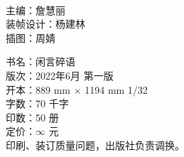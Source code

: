 \documentclass[twoside,openany]{ctexbook}
\begin{document}

\thispagestyle{empty}

\thispagestyle{empty}
\newpage
\ %
\thispagestyle{empty}
\newpage



\thispagestyle{empty}


\clearpage

\thispagestyle{empty}
\vspace*{\fill}

\begin{flushleft}
  \begingroup

  主\hspace*{2\ccwd}编：詹慧丽\\
  装帧设计：杨建林\\
  插\hspace*{2\ccwd}图：周\hspace*{1\ccwd}婧\\
  \endgroup
\end{flushleft}
\vspace{3em}
\begin{flushleft}

  \begingroup

  书\hspace*{2\ccwd}名：闲言碎语\\
  版\hspace*{2\ccwd}次：2022年6月 第一版\\
  开\hspace*{2\ccwd}本：889 mm $\times$ 1194 mm  1/32\\
  字\hspace*{2\ccwd}数：70 千字\\
  印\hspace*{2\ccwd}数：50 册\\
  定\hspace*{2\ccwd}价：$\infty$ 元\\
  \vspace{2em}
  印刷、装订质量问题，出版社负责调换。
  \endgroup
\end{flushleft}

\clearpage

\thispagestyle{empty}
\vspace*{1em}
\noindent{}
\newpage

\thispagestyle{empty}
\
\newpage

\thispagestyle{empty}

\newpage

\thispagestyle{empty}
\
\newpage

\thispagestyle{empty}
\setcounter{page}{1}
\heiti{\tableofcontents}

\songti
\mainmatter
\hypersetup{pageanchor=true}


% 












\newpage
\thispagestyle{empty}
\
\newpage
\thispagestyle{empty}

\end{document}

